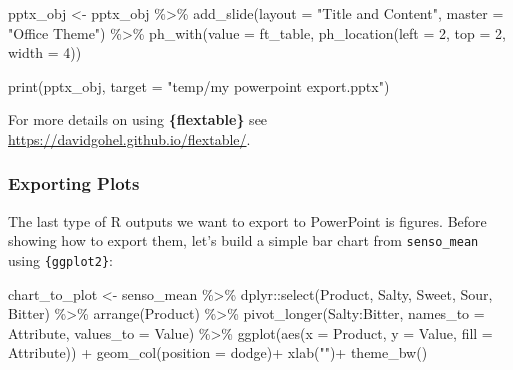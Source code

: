 \documentclass[
]{book}
\newenvironment{Shaded}{\begin{snugshade}}{\end{snugshade}}
\newcommand{\AttributeTok}[1]{\textcolor[rgb]{0.77,0.63,0.00}{#1}}
\newcommand{\DecValTok}[1]{\textcolor[rgb]{0.00,0.00,0.81}{#1}}
\newcommand{\FunctionTok}[1]{\textcolor[rgb]{0.00,0.00,0.00}{#1}}
\newcommand{\NormalTok}[1]{#1}
\newcommand{\OtherTok}[1]{\textcolor[rgb]{0.56,0.35,0.01}{#1}}
\newcommand{\SpecialCharTok}[1]{\textcolor[rgb]{0.00,0.00,0.00}{#1}}
\newcommand{\StringTok}[1]{\textcolor[rgb]{0.31,0.60,0.02}{#1}}
\begin{document}
\begin{Shaded}
\begin{Highlighting}[]
\NormalTok{pptx\_obj }\OtherTok{\textless{}{-}}\NormalTok{ pptx\_obj }\SpecialCharTok{\%\textgreater{}\%}
  \FunctionTok{add\_slide}\NormalTok{(}\AttributeTok{layout =} \StringTok{"Title and Content"}\NormalTok{, }\AttributeTok{master =} \StringTok{"Office Theme"}\NormalTok{) }\SpecialCharTok{\%\textgreater{}\%}
  \FunctionTok{ph\_with}\NormalTok{(}\AttributeTok{value =}\NormalTok{ ft\_table, }\FunctionTok{ph\_location}\NormalTok{(}\AttributeTok{left =} \DecValTok{2}\NormalTok{, }\AttributeTok{top =} \DecValTok{2}\NormalTok{, }\AttributeTok{width =} \DecValTok{4}\NormalTok{)) }

\FunctionTok{print}\NormalTok{(pptx\_obj, }\AttributeTok{target =} \StringTok{"temp/my powerpoint export.pptx"}\NormalTok{)}
\end{Highlighting}
\end{Shaded}

For more details on using \textbf{\{flextable\}} see \url{https://davidgohel.github.io/flextable/}.

\hypertarget{exporting-plots}{%
\subsubsection{Exporting Plots}\label{exporting-plots}}

The last type of R outputs we want to export to PowerPoint is figures. Before showing how to export them, let's build a simple bar chart from \texttt{senso\_mean} using \texttt{\{ggplot2\}}:

\begin{Shaded}
\begin{Highlighting}[]
\NormalTok{chart\_to\_plot }\OtherTok{\textless{}{-}}\NormalTok{ senso\_mean }\SpecialCharTok{\%\textgreater{}\%}
\NormalTok{  dplyr}\SpecialCharTok{::}\FunctionTok{select}\NormalTok{(Product, Salty, Sweet, Sour, Bitter) }\SpecialCharTok{\%\textgreater{}\%} 
  \FunctionTok{arrange}\NormalTok{(Product) }\SpecialCharTok{\%\textgreater{}\%} 
  \FunctionTok{pivot\_longer}\NormalTok{(Salty}\SpecialCharTok{:}\NormalTok{Bitter, }\AttributeTok{names\_to =} \StringTok{\textquotesingle{}Attribute\textquotesingle{}}\NormalTok{, }\AttributeTok{values\_to =} \StringTok{\textquotesingle{}Value\textquotesingle{}}\NormalTok{) }\SpecialCharTok{\%\textgreater{}\%} 
  \FunctionTok{ggplot}\NormalTok{(}\FunctionTok{aes}\NormalTok{(}\AttributeTok{x =}\NormalTok{ Product, }\AttributeTok{y =}\NormalTok{ Value, }\AttributeTok{fill =}\NormalTok{ Attribute)) }\SpecialCharTok{+} 
  \FunctionTok{geom\_col}\NormalTok{(}\AttributeTok{position =} \StringTok{\textquotesingle{}dodge\textquotesingle{}}\NormalTok{)}\SpecialCharTok{+}
  \FunctionTok{xlab}\NormalTok{(}\StringTok{""}\NormalTok{)}\SpecialCharTok{+}
  \FunctionTok{theme\_bw}\NormalTok{()}
\end{Highlighting}
\end{Shaded}
\end{document}
